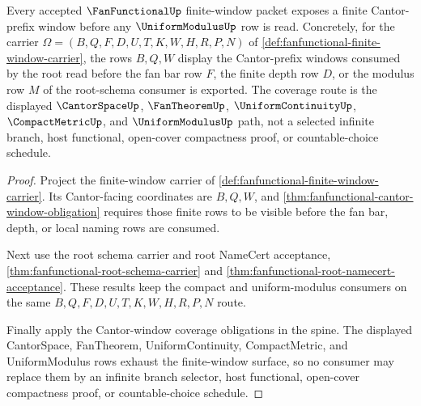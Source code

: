 \begin{theorem}
\label{thm:fan-functional-finite-window-coverage}
Every accepted $\FanFunctionalUp$ finite-window packet exposes a finite Cantor-prefix window before any $\UniformModulusUp$ row is read. Concretely, for the carrier $\Omega=(B,Q,F,D,U,T,K,W,H,R,P,N)$ of \autoref{def:fanfunctional-finite-window-carrier}, the rows $B,Q,W$ display the Cantor-prefix windows consumed by the root read before the fan bar row $F$, the finite depth row $D$, or the modulus row $M$ of the root-schema consumer is exported. The coverage route is the displayed $\CantorSpaceUp$, $\FanTheoremUp$, $\UniformContinuityUp$, $\CompactMetricUp$, and $\UniformModulusUp$ path, not a selected infinite branch, host functional, open-cover compactness proof, or countable-choice schedule.
\end{theorem}
\begin{proof}
Project the finite-window carrier of \autoref{def:fanfunctional-finite-window-carrier}. Its Cantor-facing coordinates are $B,Q,W$, and \autoref{thm:fanfunctional-cantor-window-obligation} requires those finite rows to be visible before the fan bar, depth, or local naming rows are consumed.

Next use the root schema carrier and root NameCert acceptance, \autoref{thm:fanfunctional-root-schema-carrier} and \autoref{thm:fanfunctional-root-namecert-acceptance}. These results keep the compact and uniform-modulus consumers on the same $B,Q,F,D,U,T,K,W,H,R,P,N$ route.

Finally apply the Cantor-window coverage obligations in the spine. The displayed CantorSpace, FanTheorem, UniformContinuity, CompactMetric, and UniformModulus rows exhaust the finite-window surface, so no consumer may replace them by an infinite branch selector, host functional, open-cover compactness proof, or countable-choice schedule.
\end{proof}

